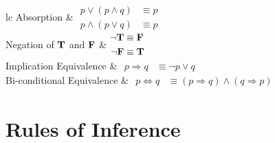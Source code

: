 \documentclass[main.tex]{subfiles}
\begin{document}
\begin{table}[H]
\begin{tabular}{lc}
		\midrule
		Absorption & \(\begin{aligned} p \lor (p \land q) &\equiv p \\ p \land (p \lor q) &\equiv p \end{aligned}\) \\
		\midrule
		Negation of \(\mathbf{T}\) and \(\mathbf{F}\) & \(\begin{aligned} \lnot \mathbf{T} &\equiv \mathbf{F} \\ \lnot \mathbf{F} &\equiv \mathbf{T} \end{aligned}\) \\
		\midrule
		Implication Equivalence & \(\begin{aligned} p \Rightarrow q &\equiv \lnot p \lor q \end{aligned}\) \\
		\midrule
		Bi-conditional Equivalence & \(\begin{aligned} p \Leftrightarrow q &\equiv (p \Rightarrow q) \land (q \Rightarrow p) \end{aligned}\) \\
		\bottomrule
	\end{tabular}
\end{table}
\pagebreak

\section{Rules of Inference}
\end{document}
